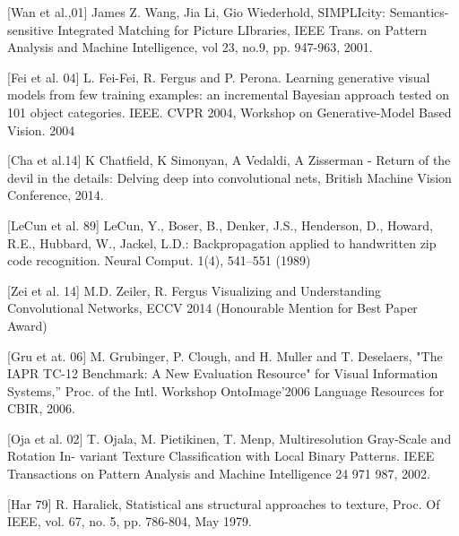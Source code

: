 [Wan et al.,01] James Z. Wang, Jia Li, Gio Wiederhold, SIMPLIcity: Semantics-sensitive Integrated Matching for Picture LIbraries, IEEE Trans. on Pattern Analysis and Machine Intelligence, vol 23, no.9, pp. 947-963, 2001.

[Fei et al. 04] L. Fei-Fei, R. Fergus and P. Perona. Learning generative visual models from few training examples: an incremental Bayesian approach tested on 101 object categories. IEEE. CVPR 2004, Workshop on Generative-Model Based Vision. 2004

[Cha et al.14] K Chatfield, K Simonyan, A Vedaldi, A Zisserman - Return of the devil in the details: Delving deep into convolutional nets, British Machine Vision Conference, 2014.




[LeCun et al. 89] LeCun, Y., Boser, B., Denker, J.S., Henderson, D., Howard, R.E., Hubbard, W., Jackel, L.D.: Backpropagation applied to handwritten zip code recognition. Neural
Comput. 1(4), 541–551 (1989)

[Zei et al. 14] M.D. Zeiler, R. Fergus Visualizing and Understanding Convolutional Networks, ECCV 2014 (Honourable Mention for Best Paper Award)

[Gru et at. 06] M. Grubinger, P. Clough, and H. Muller and T. Deselaers, "The IAPR TC-12 Benchmark: A New Evaluation Resource" for Visual Information Systems,” Proc. of the Intl. Workshop OntoImage’2006 Language Resources for CBIR, 2006.



[Oja et al. 02] T. Ojala, M. Pietikinen, T. Menp, Multiresolution Gray-Scale and Rotation In-
variant Texture Classification with Local Binary Patterns. IEEE Transactions on
Pattern Analysis and Machine Intelligence 24 971 987, 2002.

[Har 79] R. Haralick, Statistical ans structural approaches to texture, Proc. Of IEEE, vol.
67, no. 5, pp. 786-804, May 1979.

